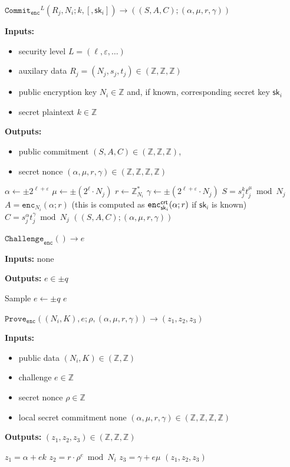 \documentclass[11pt]{article}
\def\crt{{\sf crt}}
\newenvironment{inlineAlgorithm}{}{}
\newcommand{\algoName}[1]{#1 \par}
\newcommand{\algoInputs}[1]{
    {\small \bf Inputs:} #1 \par
}
\newcommand{\algoInputsList}[1]{
    {\small \bf Inputs:} 
        \begin{itemize}[noitemsep,topsep=0pt]
            #1
        \end{itemize}
}
\newcommand{\algoOutputs}[1]{
    {\small \bf Outputs:} #1 \par
}
\newcommand{\algoOutputsList}[1]{
    {\small \bf Outputs:}
        \begin{itemize}[noitemsep,topsep=0pt]
            #1
        \end{itemize}
}
\newcommand{\enc}{\ensuremath{\mathtt{enc}}}
\newcommand{\commit}[1]{\ensuremath{\mathtt{Commit}_{\mathtt{#1}}}}
\newcommand{\challenge}[1]{\ensuremath{\mathtt{Challenge}_{\mathtt{#1}}}}
\newcommand{\prove}[1]{\ensuremath{\mathtt{Prove}_{\mathtt{#1}}}}
\newcommand{\sk}{\textsf{sk}}
\newcommand{\Z}{\mathbb{Z}}
\newcommand{\?}[1]{\stackrel{?}{#1}}
\begin{document}
\begin{description}

\item
\begin{inlineAlgorithm}
\algoName{$\commit{enc}^L(R_j, N_i; k, [, \sk_i]) \to ((S, A, C); (\alpha, \mu, r, \gamma))$}
\algoInputsList{
    \item security level $L = (\ell, \varepsilon, \dots)$
    \item auxilary data $R_j = (N_j, s_j, t_j) \in (\Z, \Z, \Z)$
    \item public encryption key $N_i \in \Z$ and, if known, corresponding secret key $\sk_i$
    \item secret plaintext $k \in \Z$
}
\algoOutputsList{
    \item public commitment $(S, A, C) \in (\Z, \Z, \Z)$,
    \item secret nonce $(\alpha, \mu, r, \gamma) \in (\Z, \Z, \Z, \Z)$
}
\begin{algorithmic}[1]
\State $\alpha \gets \pm 2^{\ell + \varepsilon}$
\State $\mu \gets \pm (2^\ell \cdot N_j)$
\State $r \gets \Z_{N_i}^*$
\State $\gamma \gets \pm (2^{\ell + \varepsilon} \cdot N_j)$
\Statex
\State $S = s_j^k t_j^\mu \bmod N_j$ 
\State $A = \enc_{N_i}(\alpha; r)$  (this is computed as $\enc^\crt_{\sk_i}(\alpha; r)$ if $\sk_i$ is known)
\State $C = s_j^\alpha t_j^\gamma \bmod N_j$ 
\State \Return $((S, A, C); (\alpha, \mu, r, \gamma))$
\end{algorithmic}
\end{inlineAlgorithm}

\item
\begin{inlineAlgorithm}
\algoName{$\challenge{enc}() \to e$}
\algoInputs{none}
\algoOutputs{$e \in \pm q$}
\begin{algorithmic}[1]
\State Sample $e \gets \pm q$
\State \Return $e$
\end{algorithmic}

\item
\begin{inlineAlgorithm}
\algoName{$\prove{enc}((N_i, K), e; \rho, (\alpha, \mu, r, \gamma)) \to (z_1, z_2, z_3)$}
\algoInputsList{
    \item public data $(N_i, K) \in (\Z, \Z)$
    \item challenge $e \in \Z$
    \item secret nonce $\rho \in \Z$
    \item local secret commitment none $(\alpha, \mu, r, \gamma) \in (\Z, \Z, \Z, \Z)$
}
\algoOutputs{$(z_1, z_2, z_3) \in (\Z, \Z, \Z)$}
\begin{algorithmic}[1]
\State $z_1 = \alpha + e k $
\State $z_2 = r \cdot \rho^e \bmod N_i $
\State $z_3 = \gamma + e \mu$
\State \Return $(z_1, z_2, z_3)$
\end{algorithmic}
\end{inlineAlgorithm}
\end{inlineAlgorithm}


\end{description}
\end{document}
